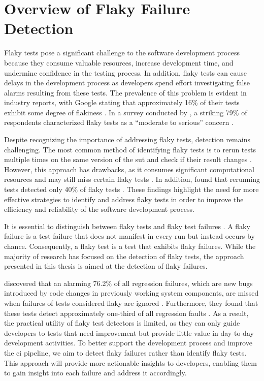 \section{Overview of Flaky Failure Detection}
Flaky tests pose a significant challenge to the software development process because they consume valuable resources, increase development time, and undermine confidence in the testing process.
In addition, flaky tests can cause delays in the development process as developers spend effort investigating false alarms resulting from these tests.
The prevalence of this problem is evident in industry reports, with Google stating that approximately 16\% of their tests exhibit some degree of flakiness \autocite{micco_state_2017}.
In a survey conducted by \citeauthor*{eck_understanding_2019}, a striking 79\% of respondents characterized flaky tests as a \enquote{moderate to serious} concern \autocite{eck_understanding_2019}.

Despite recognizing the importance of addressing flaky tests, detection remains challenging.
The most common method of identifying flaky tests is to rerun tests multiple times on the same version of the \ac{sut} and check if their result changes \autocite{lam_idflakies_2019, lam_understanding_2020}.
However, this approach has drawbacks, as it consumes significant computational resources and may still miss certain flaky tests \autocite{bell_deflaker_2018, luo_empirical_2014}.
In addition, \citeauthor*{parry_what_2022} found that rerunning tests detected only 40\% of flaky tests \autocite{parry_what_2022}.
These findings highlight the need for more effective strategies to identify and address flaky tests in order to improve the efficiency and reliability of the software development process.

It is essential to distinguish between flaky tests and flaky test failures \autocite{haben_importance_2023}.
A flaky failure is a test failure that does not manifest in every run but instead occurs by chance.
Consequently, a flaky test is a test that exhibits flaky failures.
While the majority of research has focused on the detection of flaky tests, the approach presented in this thesis is aimed at the detection of flaky failures.

 discovered that an alarming 76.2\% of all regression failures, which are new bugs introduced by code changes in previously working system components, are missed when failures of tests considered flaky are ignored \autocite{haben_importance_2023}.
Furthermore, they found that these tests detect approximately one-third of all regression faults \autocite{haben_importance_2023}.
As a result, the practical utility of flaky test detectors is limited, as they can only guide developers to tests that need improvement but provide little value in day-to-day development activities.
To better support the development process and improve the \ac{ci} pipeline, we aim to detect flaky failures rather than identify flaky tests.
This approach will provide more actionable insights to developers, enabling them to gain insight into each failure and address it accordingly.

